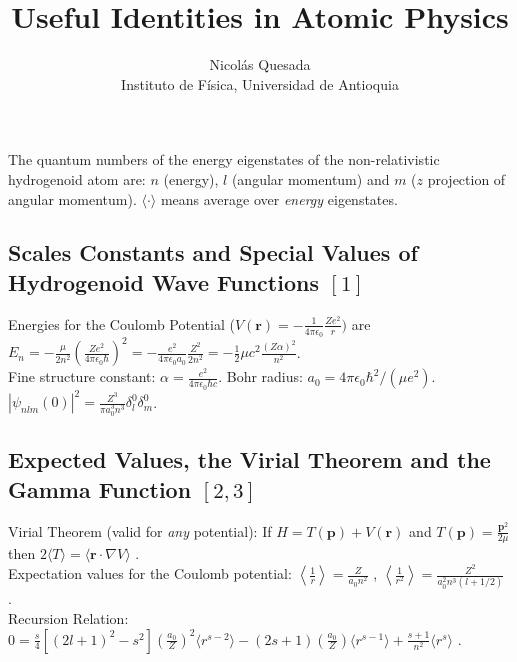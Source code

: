 \documentclass[10.5pt,letterpaper]{article}
\title{Useful Identities in Atomic Physics}
\author{Nicol\'as Quesada\\{\small \sf Instituto de F\'isica, Universidad de Antioquia}}
\date{}
\begin{document}
\maketitle
\thispagestyle{empty}
\noindent The quantum numbers of the energy eigenstates of the non-relativistic hydrogenoid atom are: $n$ (energy), $l$ (angular momentum) and $m$ ($z$ projection of angular momentum). $\langle \cdot \rangle$ means average over \emph{energy} eigenstates.

\subsection*{Scales Constants and Special Values of Hydrogenoid Wave Functions $[1]$}

Energies for the Coulomb Potential ($V(\textbf{r})=-\frac{1}{4 \pi \epsilon_0}\frac{Z e^2}{r})$ are $E_n=-\frac{\mu}{2n^2}\left( \frac{Ze^2}{4 \pi \epsilon_0 \hbar} \right)^2=-\frac{e^2}{4 \pi \epsilon_0 a_0} \frac{Z^2}{2 n^2}=-\frac{1}{2} \mu c^2 \frac{(Z \alpha)^2}{n ^2}$.\\

\noindent Fine structure constant: $\alpha=\frac{e^2}{4 \pi \epsilon_0 \hbar c}$. Bohr radius: $a_0=4 \pi \epsilon_0 \hbar^2/(\mu e^2)$. \space \space \space
$|\psi_{n l m}(0)|^2=\frac{Z^3}{\pi a_0^3 n^3} \delta_{l}^0 \delta_m^0$.

\subsection*{Expected Values, the Virial Theorem and the Gamma Function $[2,3]$}

Virial Theorem (valid for \emph{any} potential): If $H=T(\textbf{p})+V(\textbf{r})$ and $T(\textbf{p})=\frac{\textbf{p}^2}{2\mu}$ then $2\langle T \rangle=\langle \textbf{r} \cdot \nabla V \rangle$ .\\

\noindent Expectation values for the Coulomb potential: $\left\langle \frac{1}{r} \right\rangle=\frac{Z}{a_0 n^2}$ , $\left\langle \frac{1}{r^2} \right\rangle=\frac{Z^2}{a_0^2 n^3 (l+1/2)}$ .\\

\noindent Recursion Relation: $0=\frac{s}{4}\left[(2 l+1)^2-s^2 \right] \left( \frac{a_0}{Z} \right)^2 \langle r^{s-2} \rangle-(2s+1)\left(\frac{a_0}{Z} \right) \langle r^{s-1} \rangle+\frac{s+1}{n^2} \langle r^s \rangle$ .\\
\end{document}
